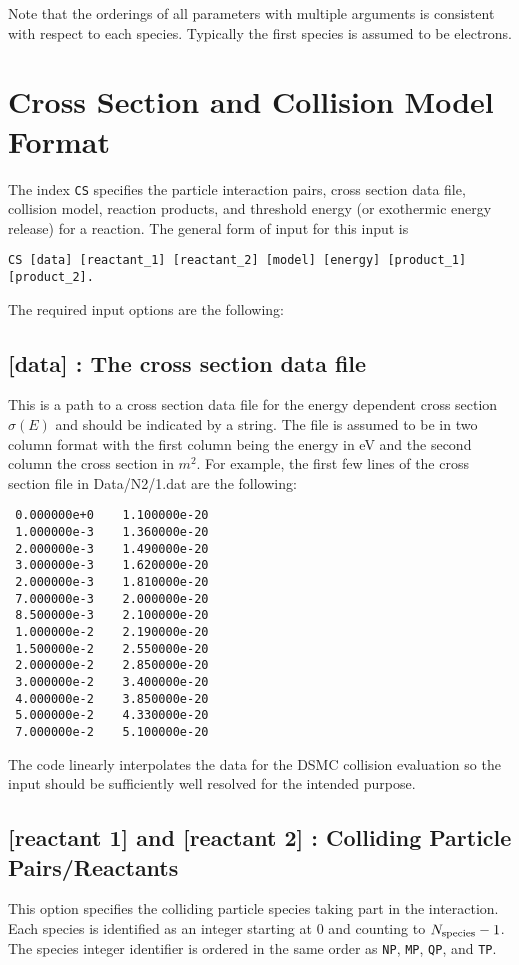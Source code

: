 \documentclass[letterpaper,10pt,english,openany,oneside]{sphinxmanual}
\begin{document}
Note that the orderings of all parameters with multiple arguments is
consistent with respect to each species. Typically the first species
is assumed to be electrons.

\section{Cross Section and Collision Model Format}
The index \texttt{CS} specifies the particle interaction pairs, cross section data file,
collision model, reaction products, and threshold energy (or exothermic energy release)
for a reaction. The general form of input for this input is 

\begin{lstlisting}[frame=single]
CS [data] [reactant_1] [reactant_2] [model] [energy] [product_1] [product_2]. 
\end{lstlisting}
The required input options are the following:

\subsection{[data] : The cross section data file}
This is a path to a cross section data file for the energy dependent cross section
$\sigma(E)$ and should be indicated by a string. The file is assumed to be in two column
format with the first column being the energy in eV and the second column the cross
section in $m^2$. For example, the first few lines of the cross section file in
Data/N2/1.dat are the following:

\begin{lstlisting}
 0.000000e+0	1.100000e-20
 1.000000e-3	1.360000e-20
 2.000000e-3	1.490000e-20
 3.000000e-3	1.620000e-20
 2.000000e-3	1.810000e-20
 7.000000e-3	2.000000e-20
 8.500000e-3	2.100000e-20
 1.000000e-2	2.190000e-20
 1.500000e-2	2.550000e-20
 2.000000e-2	2.850000e-20
 3.000000e-2	3.400000e-20
 4.000000e-2	3.850000e-20
 5.000000e-2	4.330000e-20
 7.000000e-2	5.100000e-20
 \end{lstlisting}
 The code linearly interpolates the data for the DSMC collision evaluation so the input
 should be sufficiently well resolved for the intended purpose. 
 
\subsection{[reactant 1]  and [reactant 2]  : Colliding Particle Pairs/Reactants }
This option specifies the colliding particle species taking part in the interaction. Each
species is identified as an integer starting at 0 and counting to $N_{\rm species}-1$.
The species integer identifier is ordered in the same order as  \texttt{NP}, \texttt{MP},
\texttt{QP}, and \texttt{TP}.
\end{document}

